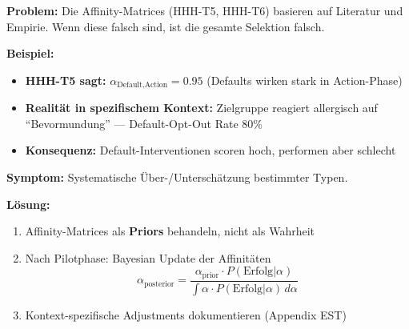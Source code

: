 \begin{tcolorbox}[colback=red!5!white, colframe=red!75!black,
    title=\textbf{Failure Mode 2: Affinity-Matrix-Fehler}]

\textbf{Problem:} Die Affinity-Matrices (HHH-T5, HHH-T6) basieren auf Literatur und Empirie. Wenn diese falsch sind, ist die gesamte Selektion falsch.

\medskip
\textbf{Beispiel:}
\begin{itemize}[nosep]
    \item \textbf{HHH-T5 sagt:} $\alpha_{\text{Default}, \text{Action}} = 0.95$ (Defaults wirken stark in Action-Phase)
    \item \textbf{Realität in spezifischem Kontext:} Zielgruppe reagiert allergisch auf ``Bevormundung'' --- Default-Opt-Out Rate 80\%
    \item \textbf{Konsequenz:} Default-Interventionen scoren hoch, performen aber schlecht
\end{itemize}

\medskip
\textbf{Symptom:} Systematische Über-/Unterschätzung bestimmter Typen.

\textbf{Lösung:}
\begin{enumerate}[nosep]
    \item Affinity-Matrices als \textbf{Priors} behandeln, nicht als Wahrheit
    \item Nach Pilotphase: Bayesian Update der Affinitäten
    \begin{equation*}
    \alpha_{\text{posterior}} = \frac{\alpha_{\text{prior}} \cdot P(\text{Erfolg}|\alpha)}{\int \alpha \cdot P(\text{Erfolg}|\alpha) \, d\alpha}
    \end{equation*}
    \item Kontext-spezifische Adjustments dokumentieren (Appendix EST)
\end{enumerate}

\end{tcolorbox}

